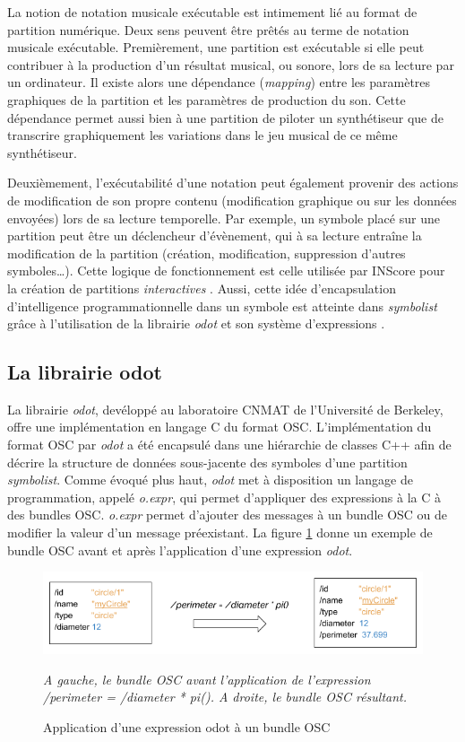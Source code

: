 La notion de notation musicale exécutable est intimement lié au format de partition numérique. Deux sens peuvent être prêtés au terme de notation musicale exécutable. 
Premièrement, une partition est exécutable si elle peut contribuer à la production d'un résultat musical, ou sonore, lors de sa lecture par un ordinateur. Il existe alors une dépendance (\textit{mapping}) entre les paramètres graphiques de la partition et les paramètres de production du son. Cette dépendance permet aussi bien à une partition de piloter un synthétiseur que de transcrire graphiquement les variations dans le jeu musical de ce même synthétiseur.

Deuxièmement, l'exécutabilité d'une notation peut également provenir des actions de modification de son propre contenu (modification graphique ou sur les données envoyées) lors de sa lecture temporelle. Par exemple, un  symbole placé sur une partition peut être un déclencheur d'évènement, qui à sa lecture entraîne la modification de la partition (création, modification, suppression d'autres symboles…). Cette logique de fonctionnement est celle utilisée par INScore pour la création de partitions \textit{interactives} \cite{fober2017}.
Aussi, cette idée d'encapsulation d'intelligence programmationnelle dans un symbole est atteinte dans \textit{symbolist} grâce à l'utilisation de la librairie \textit{odot} et son système d'expressions \cite{maccallum2011}.

\subsection{La librairie odot}
\label{subsec:odotLibrary}
La librairie \textit{odot}, devéloppé au laboratoire CNMAT de l'Université de Berkeley, offre une implémentation en langage C du format OSC. L'implémentation du format OSC par \textit{odot} a été encapsulé dans une hiérarchie de classes C++ afin de décrire la structure de données sous-jacente des symboles d'une partition \textit{symbolist}. Comme évoqué plus haut, \textit{odot} met à disposition un langage de programmation, appelé \textit{o.expr}, qui permet d'appliquer des expressions \og à la C \fg à des bundles OSC. \textit{o.expr} permet d'ajouter des messages à un bundle OSC ou de modifier la valeur d'un message préexistant. La figure \ref{fig:applyOdotExpr} donne un exemple de bundle OSC avant et après l'application d'une expression \textit{odot}.

\begin{figure}[H]
	\centering
	\includegraphics[keepaspectratio=true, width=\textwidth]{ModeleDeNotation/i/applyOdotExpr.png}
	\caption{Application d'une expression odot à un bundle OSC}
	\label{fig:applyOdotExpr}
	\small
	\textit{A gauche, le bundle OSC avant l'application de l'expression \emph{/perimeter = /diameter * pi()}. A droite, le bundle OSC résultant.}
\end{figure}

